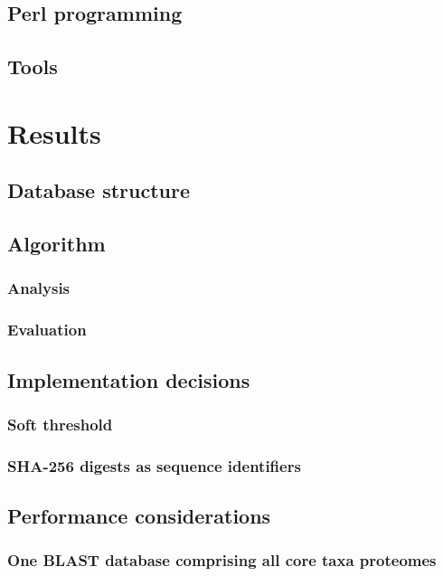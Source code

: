 \documentclass[a4paper,12pt]{scrreprt}
\begin{document}
	\section{Perl programming}
		
	\section{Tools}
		

\chapter{Results}
	
	\section{Database structure}
		
	\section{Algorithm}
		
		\subsection{Analysis}
			
		\subsection{Evaluation}
			
	\section{Implementation decisions}
		\subsection{Soft threshold}
			
		\subsection{SHA-256 digests as sequence identifiers}
			
	\section{Performance considerations}
		\subsection{One BLAST database comprising all core taxa proteomes}
			
\end{document}
